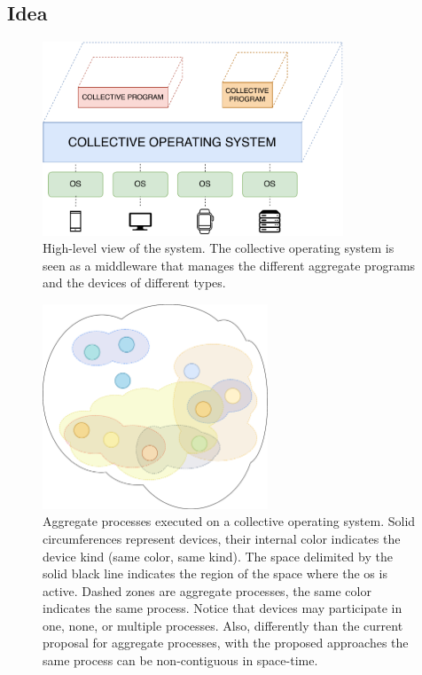 \documentclass[12pt, a4paper]{article}
\begin{document}
\subsection{Idea}
\label{subsec:idea}

\begin{figure}
    \centering
    \includegraphics[width=0.8\textwidth]{figures/system}
    \caption{
        High-level view of the system.
        The collective operating system is seen as a middleware that manages the different aggregate programs and the devices
        of different types.
    }\label{fig:system}
\end{figure}

\begin{figure}[h!]
    \centering
    \includegraphics[width=0.6\textwidth]{figures/processes}
    \caption{
        Aggregate processes executed on a collective operating system.
        Solid circumferences represent devices, their internal color indicates the device kind
        (same color, same kind).
        The space delimited by the solid black line indicates the region of the space where the
        \ac{os} is active.
        Dashed zones are aggregate processes,
        the same color indicates the same process.
        Notice that devices may participate in one, none, or multiple processes.
        Also, differently than the current proposal for aggregate processes,
        with the proposed approaches the same process can be non-contiguous in space-time.
    }\label{fig:processes}
\end{figure}
\end{document}
